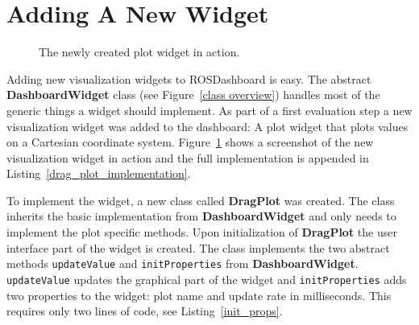\section{Adding A New Widget}
\begin{figure}[htb]
  \centering
  \caption{The newly created plot widget in action.}
  \label{plot_widget}
\end{figure}

Adding new visualization widgets to ROSDashboard is easy. The abstract \textbf{DashboardWidget} class (see Figure~\ref{class overview}) handles most of the generic things a widget should implement. As part of a first evaluation step a new visualization widget was added to the dashboard: A plot widget that plots values on a Cartesian coordinate system. Figure~\ref{plot_widget} shows a screenshot of the new visualization widget in action and the full implementation is appended in Listing~\ref{drag_plot_implementation}.

To implement the widget, a new class called \textbf{DragPlot} was created. The class inherits the basic implementation from \textbf{DashboardWidget} and only needs to implement the plot specific methods. Upon initialization of \textbf{DragPlot} the user interface part of the widget is created. The class implements the two abstract methods \verb+updateValue+ and \verb+initProperties+ from \textbf{DashboardWidget}. \verb+updateValue+ updates the graphical part of the widget and \verb+initProperties+ adds two properties to the widget: plot name and update rate in milliseconds. This requires only two lines of code, see Listing~\ref{init_props}.

